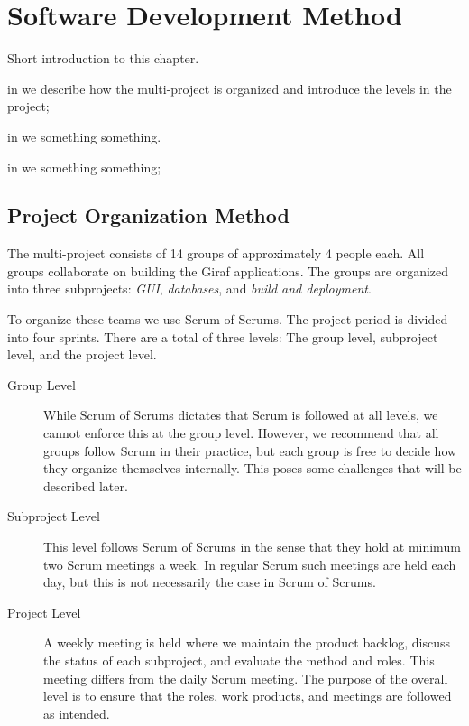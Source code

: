 \chapter{Software Development Method}%
Short introduction to this chapter. \dummy~\dummy~\dummy~\dummy~\dummy~\dummy

\begin{chapterorganization}
  \item in  we describe how the multi-project is organized and introduce the levels in the project;
  \item in  we something something.
  \item in  we something something;
\end{chapterorganization}

\section{Project Organization Method}\label{sec:project_overview}
The multi-project consists of 14 groups of approximately 4 people each. All groups collaborate on building the Giraf applications. The groups are organized into three subprojects: \emph{GUI}, \emph{databases}, and \emph{build and deployment}.

To organize these teams we use Scrum of Scrums. The project period is divided into four sprints. There are a total of three levels: The group level, subproject level, and the project level.

\begin{description}
	\item[Group Level] While Scrum of Scrums dictates that Scrum is followed at all levels, we cannot enforce this at the group level. However, we recommend that all groups follow Scrum in their practice, but each group is free to decide how they organize themselves internally. This poses some challenges that will be described later.
	\item[Subproject Level] This level follows Scrum of Scrums in the sense that they hold at minimum two Scrum meetings a week. In regular Scrum such meetings are held each day, but this is not necessarily the case in Scrum of Scrums.
	\item[Project Level] A weekly meeting is held where we maintain the product backlog, discuss the status of each subproject, and evaluate the method and roles. This meeting differs from the daily Scrum meeting. The purpose of the overall level is to ensure that the roles, work products, and meetings are followed as intended.
\end{description}

